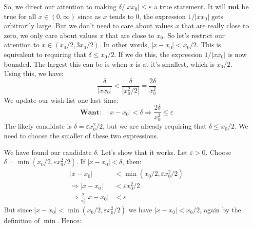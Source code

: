 \documentclass{article}
\theoremstyle{normal}
\begin{document}
    So, we direct our attention to making $\delta/|xx_{0}|\leq\varepsilon$ a
    true statement. It will \textbf{not} be true for all $x\in(0,\infty)$ since
    as $x$ tends to 0, the expression $1/|xx_{0}|$ gets arbitrarily large. But
    we don't need to care about values $x$ that are really close to zero, we
    only care about values $x$ that are close to $x_{0}$. So let's restrict
    our attention to $x\in(x_{0}/2,3x_{0}/2)$. In other words,
    $|x-x_{0}|<x_{0}/2$. This is equivalent to requiring that
    $\delta\leq{x}_{0}/2$. If we do this, the expression
    $1/|xx_{0}|$ is now bounded. The largest this can be is when $x$ is at
    it's smallest, which is $x_{0}/2$. Using this, we have:
    \begin{equation}
        \frac{\delta}{|xx_{0}|}<\frac{\delta}{|x_{0}^{2}/2|}
        =\frac{2\delta}{x_{0}^{2}}
    \end{equation}
    We update our wish-list one last time:
    \begin{equation}
        \textbf{Want:}\quad
        |x-x_{0}|<\delta
        \Rightarrow
        \frac{2\delta}{x_{0}^{2}}\leq\varepsilon
    \end{equation}
    The likely candidate is $\delta=\varepsilon{x}_{0}^{2}/2$, but we are
    already requiring that $\delta\leq{x}_{0}/2$. We need to choose the smaller
    of these two expressions.
    \par\hfill\par
    We have found our candidate $\delta$. Let's show that it works.
    Let $\varepsilon>0$. Choose $\delta=\min(x_{0}/2,\varepsilon{x}_{0}^{2}/2)$.
    If $|x-x_{0}|<\delta$, then:
    \begin{align}
        |x-x_{0}|&<\min(x_{0}/2,\varepsilon{x}_{0}^{2}/2)
            \tag{Definition of $\delta$}\\
        \Rightarrow|x-x_{0}|&<\varepsilon{x}_{0}^{2}/2
            \tag{Definition of $\min$}\\
        \Rightarrow\frac{2}{x_{0}^{2}}|x-x_{0}|&<\varepsilon
            \tag{Division by a Positive Number}
    \end{align}
    But since $|x-x_{0}|<\min(x_{0}/2,\varepsilon{x}_{0}^{2}/2)$ we have
    $|x-x_{0}|<x_{0}/2$, again by the definition of $\min$. Hence:
\end{document}
